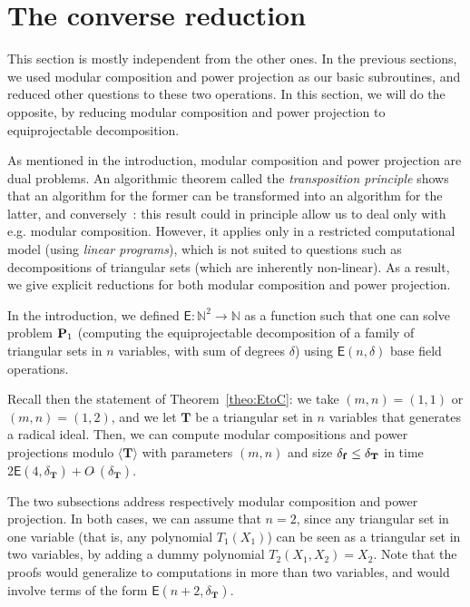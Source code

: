 \documentclass[12pt]{article}
\def\EE {\ensuremath{\mathsf{E}}}
\def\N {\ensuremath{\mathbb{N}}}
\def\Tt {\ensuremath{\mathbf{T}}}
\def\Ot {O\tilde{~}}
\begin{document}
\section{The converse reduction}\label{sec:EtoC}

This section is mostly independent from the other ones. In the
previous sections, we used modular composition and power projection as
our basic subroutines, and reduced other questions to these two
operations. In this section, we will do the opposite, by reducing
modular composition and power projection to equiprojectable
decomposition.



As mentioned in the introduction, modular composition and power
projection are dual problems. An algorithmic theorem called the {\em
  transposition principle} shows that an algorithm for the former can
be transformed into an algorithm for the latter, and
conversely~\cite{BuClSh97,BoLeSc03}: this result could in principle
allow us to deal only with e.g. modular composition. However, it
applies only in a restricted computational model (using {\em linear
  programs}), which is not suited to questions such as decompositions
of triangular sets (which are inherently non-linear). As a result, we
give explicit reductions for both modular composition and power
projection.

In the introduction, we defined $\EE: \N^2 \to \N$ as a function such
that one can solve problem ${\bf P}_1$ (computing the equiprojectable
decomposition of a family of triangular sets in $n$ variables, with
sum of degrees $\delta$) using $\EE(n,\delta)$ base field operations.

Recall then the statement of Theorem~\ref{theo:EtoC}: we take
$(m,n)=(1,1)$ or $(m,n)=(1,2)$, and we let $\Tt$ be a triangular set
in $n$ variables that generates a radical ideal. Then, we can compute
modular compositions and power projections modulo $\langle \Tt
\rangle$ with parameters $(m,n)$ and size $\delta_{\bf f} \le
\delta_\Tt$ in time $2\EE(4,\delta_\Tt)+\Ot(\delta_\Tt)$.

The two subsections address respectively modular composition and power
projection. In both cases, we can assume that $n=2$, since any
triangular set in one variable (that is, any polynomial $T_1(X_1)$)
can be seen as a triangular set in two variables, by adding a dummy
polynomial $T_2(X_1,X_2)=X_2$. Note that the proofs would generalize
to computations in more than two variables, and would involve terms of
the form $\EE(n+2,\delta_\Tt)$.
\end{document}
